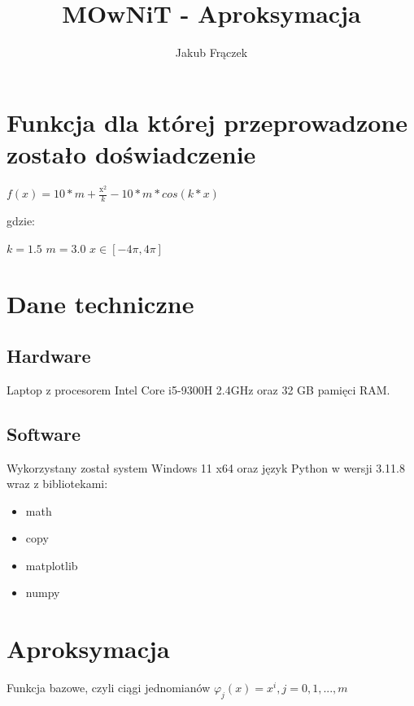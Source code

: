 \documentclass{article}
\title{MOwNiT - Aproksymacja}
\author{Jakub Frączek}
\begin{document}
\maketitle

\section{Funkcja dla której przeprowadzone zostało doświadczenie}

\begin{center}
\(f(x) = 10 * m + \frac{\mathrm{x}_{}^{2}}{k} - 10 * m * cos(k*x)\)
\end{center}

\noindent
gdzie:

\bigbreak

\(k = 1.5\)
\newline \indent
\(m = 3.0\)
\newline \indent
\(x \in [-4\pi, 4\pi]\)

\section{Dane techniczne}

\subsection{Hardware}

Laptop z procesorem Intel Core i5-9300H 2.4GHz oraz 32 GB pamięci RAM.

\subsection{Software}

Wykorzystany został system Windows 11 x64 oraz język Python w wersji 3.11.8 wraz z bibliotekami:
\begin{itemize}
\item math
\item copy
\item matplotlib
\item numpy
\end{itemize}

\section{Aproksymacja}

\noindent
Funkcja bazowe, czyli ciągi jednomianów \(\varphi _j(x) = x^i, j = 0, 1, ..., m\)
\end{document}
